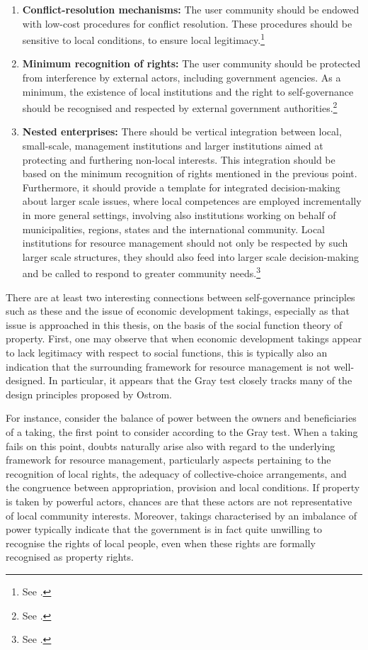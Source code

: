 \begin{enumerate}
\item {\bf Conflict-resolution mechanisms:} The user community should be endowed with low-cost procedures for conflict resolution. These procedures should be sensitive to local conditions, to ensure local legitimacy.\footnote{See \cite[100-101]{ostrom90}.}
\item {\bf Minimum recognition of rights:} The user community should be protected from interference by external actors, including government agencies. As a minimum, the existence of local institutions and the right to self-governance should be recognised and respected by external government authorities.\footnote{See \cite[101]{ostrom90}.}
\item {\bf Nested enterprises:} There should be vertical integration between local, small-scale, management institutions and larger institutions aimed at protecting and furthering non-local interests. This integration should be based on the minimum recognition of rights mentioned in the previous point. Furthermore, it should provide a template for integrated decision-making about larger scale issues, where local competences are employed incrementally in more general settings, involving also institutions working on behalf of municipalities, regions, states and the international community. Local institutions for resource management should not only be respected by such larger scale structures, they should also feed into larger scale decision-making and be called to respond to greater community needs.\footnote{See \cite[101-102]{ostrom90}.}
\end{enumerate}

There are at least two interesting connections between self-governance principles such as these and the issue of economic development takings, especially as that issue is approached in this thesis, on the basis of the social function theory of property. First, one may observe that when economic development takings appear to lack legitimacy with respect to social functions, this is typically also an indication that the surrounding framework for resource management is not well-designed. In particular, it appears that the Gray test closely tracks many of the design principles proposed by Ostrom.

For instance, consider the balance of power between the owners and beneficiaries of a taking, the first point to consider according to the Gray test. When a taking fails on this point, doubts naturally arise also with regard to the underlying framework for resource management, particularly aspects pertaining to the recognition of local rights, the adequacy of collective-choice arrangements, and the congruence between appropriation, provision and local conditions. If property is taken by powerful actors, chances are that these actors are not representative of local community interests. Moreover, takings characterised by an imbalance of power typically indicate that the government is in fact quite unwilling to recognise the rights of local people, even when these rights are formally recognised as property rights.

